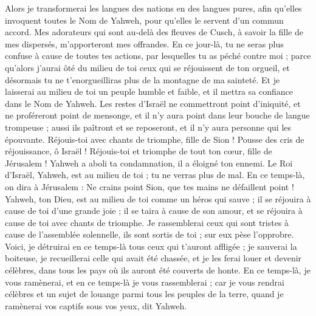 \begin{multicols}{2}
Alors je transformerai les langues des nations en des langues pures, afin qu’elles invoquent toutes le Nom de Yahweh, pour qu’elles le servent d'un commun accord.
Mes adorateurs qui sont au-delà des fleuves de Cusch, à savoir la fille de mes dispersés, m'apporteront mes offrandes.
En ce jour-là, tu ne seras plus confuse à cause de toutes tes actions, par lesquelles tu as péché contre moi ; parce qu'alors j'aurai ôté du milieu de toi ceux qui se réjouissent de ton orgueil, et désormais tu ne t'enorgueilliras plus de la montagne de ma sainteté.
Et je laisserai au milieu de toi un peuple humble et faible, et il mettra sa confiance dans le Nom de Yahweh.
Les restes d'Israël ne commettront point d'iniquité, et ne proféreront point de mensonge, et il n'y aura point dans leur bouche de langue trompeuse ; aussi ils paîtront et se reposeront, et il n'y aura personne qui les épouvante.
Réjouis-toi avec chants de triomphe, fille de Sion ! Pousse des cris de réjouissance, ô Israël ! Réjouis-toi et triomphe de tout ton cœur, fille de Jérusalem !
Yahweh a aboli ta condamnation, il a éloigné ton ennemi. Le Roi d'Israël, Yahweh, est au milieu de toi ; tu ne verras plus de mal.
En ce temps-là, on dira à Jérusalem : Ne crains point Sion, que tes mains ne défaillent point !
Yahweh, ton Dieu, est au milieu de toi comme un héros qui sauve ; il se réjouira à cause de toi d'une grande joie ; il se taira à cause de son amour, et se réjouira à cause de toi avec chants de triomphe.
Je rassemblerai ceux qui sont tristes à cause de l'assemblée solennelle, ils sont sortis de toi ; sur eux pèse l’opprobre.
Voici, je détruirai en ce temps-là tous ceux qui t'auront affligée ; je sauverai la boiteuse, je recueillerai celle qui avait été chassée, et je les ferai louer et devenir célèbres, dans tous les pays où ils auront été couverts de honte.
En ce temps-là, je vous ramènerai, et en ce temps-là je vous rassemblerai ; car je vous rendrai célèbres et un sujet de louange parmi tous les peuples de la terre, quand je ramènerai vos captifs sous vos yeux, dit Yahweh.
\PPE{}
\end{multicols}
